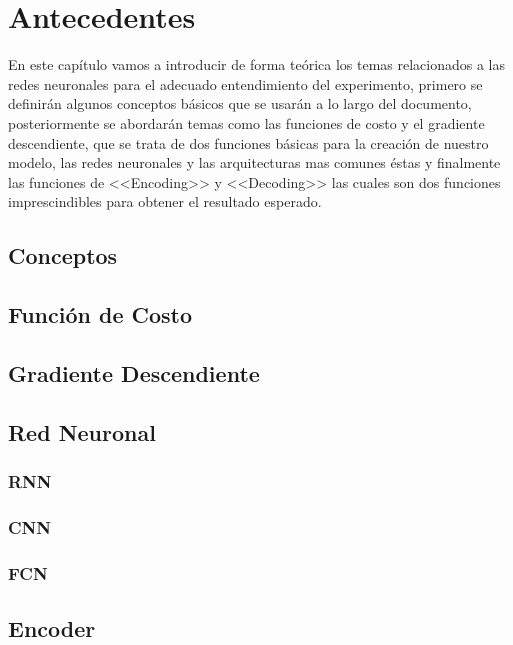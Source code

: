 
\chapter{Antecedentes}
En este capítulo vamos a introducir de forma teórica los temas relacionados a las redes neuronales para el adecuado entendimiento del experimento, primero se definirán algunos conceptos básicos que se usarán a lo largo del documento, posteriormente se abordarán temas como las funciones de costo y el gradiente descendiente, que se trata de dos funciones básicas para la creación de nuestro modelo, las redes neuronales y las arquitecturas mas comunes éstas y finalmente las funciones de <<Encoding>> y <<Decoding>> las cuales son dos funciones imprescindibles para obtener el resultado esperado.

\section{Conceptos}

\section{Función de Costo}

\section{Gradiente Descendiente}

\section{Red Neuronal}

\subsection{RNN}

\subsection{CNN}

\subsection{FCN}

\section{Encoder}

